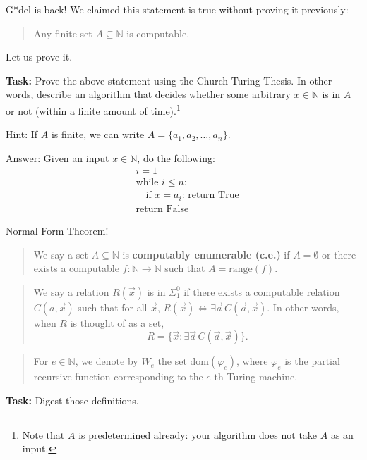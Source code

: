 \documentclass{beamer}
\begin{document}
\begin{frame}{G*del is back!}
We claimed this statement is true without proving it previously:
\begin{quotation}
Any finite set $A \subseteq \mathbb N$ is computable.
\end{quotation}
Let us prove it.

\vspace{2mm}

\textbf{Task:} Prove the above statement using the Church-Turing Thesis. In other words, describe an algorithm that decides whether some arbitrary $x \in \mathbb N$ is in $A$ or not (within a finite amount of time).\footnote{Note that $A$ is predetermined already: your algorithm does not take $A$ as an input.}

\vspace{2mm}

Hint: If $A$ is finite, we can write $A = \{a_1, a_2, \ldots, a_n\}$.

\vspace{2mm}

\pause

Answer: Given an input $x \in \mathbb N$, do the following:
\begin{align*}
& \text{$i = 1$}\\
& \text{while $i \leq n$:}\\
& \quad \text{if $x = a_i$: return True}\\
& \text{return False}
\end{align*}


\end{frame}


\begin{frame}{Normal Form Theorem!}
\begin{quotation}
We say a set $A \subseteq \mathbb N$ is \textbf{computably enumerable (c.e.)} if $A = \emptyset$ or there exists a computable $f: \mathbb N \to \mathbb N$ such that $A = \text{range}(f)$. 
\end{quotation}

\begin{quotation}
We say a relation $R(\vec{x})$ is in $\Sigma^0_1$ if there exists a computable relation $C(a, \vec{x})$ such that for all $\vec{x}$, $R(\vec{x}) \Leftrightarrow \exists \vec{a} \, C(\vec{a}, \vec{x})$. In other words, when $R$ is thought of as a set,
$$R = \{\vec{x}: \exists \vec{a} \, C(\vec{a}, \vec{x})\}.$$
\end{quotation}

\begin{quotation}
For $e \in \mathbb N$, we denote by $W_e$ the set $\text{dom}(\varphi_e)$, where $\varphi_e$ is the partial recursive function corresponding to the $e$-th Turing machine.
\end{quotation}

\textbf{Task:} Digest those definitions.

\end{frame}
\end{document}
